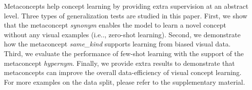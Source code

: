 \documentclass{article}
\makeatletter
\DeclareRobustCommand\onedot{\futurelet\@let@token\@onedot}
\def\@onedot{\ifx\@let@token.\else.\null\fi\xspace}
\def\ie{i.e\onedot} \def\Ie{I.e\onedot}
\makeatother
\begin{document}
\label{sec:exp:meta2concept}

Metaconcepts help concept learning by providing extra supervision at an abstract level. Three types of generalization tests are studied in this paper. First, we show that the metaconcept {\it synonym} enables the model to learn a novel concept without any visual examples (\ie, zero-shot learning). Second, we demonstrate how the metaconcept {\it same\_kind} supports learning from biased visual data. Third, we evaluate the performance of few-shot learning with the support of the metaconcept {\it hypernym}. Finally, we provide extra results to demonstrate that metaconcepts can improve the overall data-efficiency of visual concept learning.
For more examples on the data split, please refer to the supplementary material.

\label{subsubsec:zeroshot}
\end{document}
